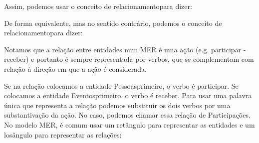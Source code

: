 \documentclass[
12pt,		%
openright,	%
twoside,  %
a4paper,			%
chapter=TITLE,		%
english,			%
french,				%
spanish,			%
brazil				%
]{USPSC-classe/USPSC_RedarTex}
\begin{document}
Assim, podemos usar o conceito de \textquotedbl relacionamento\textquotedbl  para dizer:











\noindent\begin{center}\mbox{\centering{}}\end{center}


De forma equivalente, mas no sentido contr\'ario, podemos o conceito de \textquotedbl relacionamento\textquotedbl  para dizer:











\noindent\begin{center}\mbox{\centering{}}\end{center}


Notamos que a rela\c{c}\~ao entre entidades num MER \'e uma a\c{c}\~ao (e.g. participar - receber) e portanto \'e sempre representada por verbos, que se complementam com rela\c{c}\~ao \`a dire\c{c}\~ao em que a a\c{c}\~ao \'e considerada.










Se na rela\c{c}\~ao colocamos a entidade \textquotedbl Pessoas\textquotedbl  primeiro, o verbo \'e participar. Se colocamos a entidade \textquotedbl Eventos\textquotedbl  primeiro, o verbo \'e receber. Para usar uma palavra \'unica que representa a rela\c{c}\~ao podemos substituir os dois verbos por uma substantiva\c{c}\~ao da a\c{c}\~ao. No caso, podemos chamar essa rela\c{c}\~ao de \textquotedbl Participa\c{c}\~oes\textquotedbl . No modelo MER, \'e comum usar um ret\^angulo para representar as entidades e um los\^angulo para representar as rela\c{c}\~oes:
\end{document}
